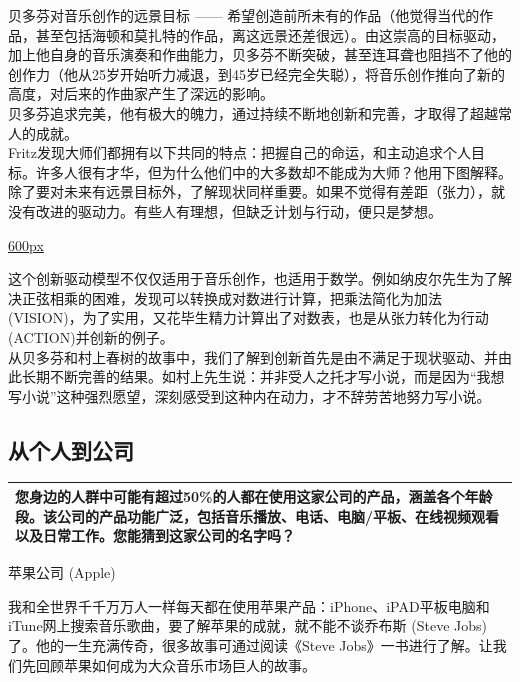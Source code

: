 贝多芬对音乐创作的远景目标 ------
希望创造前所未有的作品（他觉得当代的作品，甚至包括海顿和莫扎特的作品，离这远景还差很远）。由这崇高的目标驱动，加上他自身的音乐演奏和作曲能力，贝多芬不断突破，甚至连耳聋也阻挡不了他的创作力（他从25岁开始听力减退，到45岁已经完全失聪），将音乐创作推向了新的高度，对后来的作曲家产生了深远的影响。\\
贝多芬追求完美，他有极大的魄力，通过持续不断地创新和完善，才取得了超越常人的成就。\\
Fritz发现大师们都拥有以下共同的特点：把握自己的命运，和主动追求个人目标。许多人很有才华，但为什么他们中的大多数却不能成为大师？他用下图解释。除了要对未来有远景目标外，了解现状同样重要。如果不觉得有差距（张力），就没有改进的驱动力。有些人有理想，但缺乏计划与行动，便只是梦想。

\href{文件:liuct.png}{600px}

这个创新驱动模型不仅仅适用于音乐创作，也适用于数学。例如纳皮尔先生为了解决正弦相乘的困难，发现可以转换成对数进行计算，把乘法简化为加法(VISION)，为了实用，又花毕生精力计算出了对数表，也是从张力转化为行动(ACTION)并创新的例子。\\
从贝多芬和村上春树的故事中，我们了解到创新首先是由不满足于现状驱动、并由此长期不断完善的结果。如村上先生说：并非受人之托才写小说，而是因为``我想写小说''这种强烈愿望，深刻感受到这种内在动力，才不辞劳苦地努力写小说。

\hypertarget{ux4eceux4e2aux4ebaux5230ux516cux53f8}{%
\subsection{从个人到公司}\label{ux4eceux4e2aux4ebaux5230ux516cux53f8}}

\begin{longtable}[]{@{}l@{}}
\toprule
\endhead
您身边的人群中可能有超过50\%的人都在使用这家公司的产品，涵盖各个年龄段。该公司的产品功能广泛，包括音乐播放、电话、电脑/平板、在线视频观看以及日常工作。您能猜到这家公司的名字吗？\tabularnewline
\bottomrule
\end{longtable}

苹果公司 (Apple)

我和全世界千千万万人一样每天都在使用苹果产品：iPhone、iPAD平板电脑和iTune网上搜索音乐歌曲，要了解苹果的成就，就不能不谈乔布斯
(Steve Jobs)了。他的一生充满传奇，很多故事可通过阅读《Steve
Jobs》一书进行了解。让我们先回顾苹果如何成为大众音乐市场巨人的故事。

\begin{description}
\item[]
\begin{description}
\tightlist
\item[]
= = =
\end{description}
\end{description}

